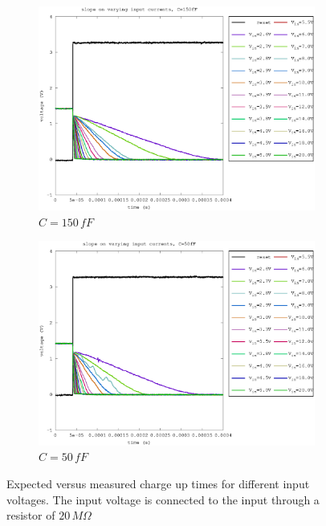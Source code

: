 \documentclass{article}
\begin{document}
\begin{figure}
\begin{subfigure}[b]{0.475\textwidth}
	    \includegraphics[width=\textwidth]{fig/slope_150fF.eps}
	    \caption[]%
	    {$C=150\,fF$}    
	    \label{fig:slopes_150fF}
	\end{subfigure}
	\quad
	\begin{subfigure}[b]{0.475\textwidth}   
	    \centering 
	    \includegraphics[width=\textwidth]{fig/slope_50fF.eps}
	    \caption[]%
	    {$C=50\,fF$}    
	    \label{fig:slopes_50fF}
	\end{subfigure}
	\caption{Expected versus measured charge up times for different input voltages. The input voltage is connected to the input through a resistor of $20\,M\Omega$}
	\label{fig:slopes}
\end{figure}
\end{document}
